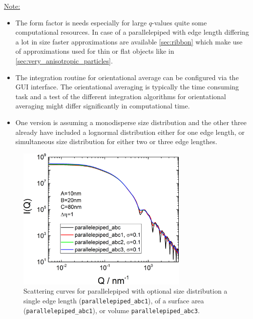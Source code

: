 \noindent\uline{Note:}
\begin{itemize}
\item The form factor is needs especially for large $q$-values quite some computational resources. In case of a parallelepiped with edge length differing a lot in size faster approximations are available \ref{sec:ribbon} which make use of approximations used for thin or flat objects like in \ref{sec:very_anisotropic_particles}.
\item The integration routine for orientational average can be configured via the GUI interface. The orientational averaging is typically the time consuming task and a test of the different integration algorithms for orientational averaging might differ significantly in computational time.
\item One version is assuming a monodisperse size distribution and the other three already have included a lognormal distribution either for one edge length, or simultaneous size distribution for either two or three edge lengthes.
\end{itemize}

\begin{figure}[htb]
\begin{center}
\includegraphics[width=0.75\textwidth]{../images/form_factor/anisotropic/parallelepipedABC.png}
\end{center}
\caption{Scattering curves for parallelepiped with optional size distribution a single edge length (\texttt{parallelepiped\_abc1}), of a surface area (\texttt{parallelepiped\_abc1}), or volume \texttt{parallelepiped\_abc3}.}
\label{fig:IQparallelepiped}
\end{figure}

